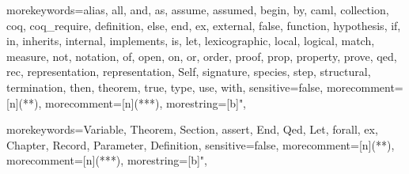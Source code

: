 \newcommand{\ocaml}{{\sf OCaml}}
\newcommand{\moca}{{\sf Moca}}
\newcommand{\focal}{{\sf FoCaL}}
\newcommand{\coq}{{\sf Coq}}
\newcommand{\cime}{{\sf CiME}}
\newcommand{\latex}{{\sf LaTeX}}
\newcommand{\zenon}{{\sf Zenon}}
\newcommand{\ocamldoc}{{\sf ocamldoc}}
\newcommand{\focdoc}{\textsc{focdoc}}
\newcommand{\focalize}{{\sf FoCaLize}}
\newcommand{\focalizec}{{\sf focalizec}}
\newcommand{\focalizedep}{{\sf focalizedep}}
\newcommand{\decldeps}[1] {\lbag\ #1\rbag}
\newcommand{\defdeps}[1]
  {\lbag\hspace{-0.2cm}\lbag\ #1\rbag\hspace{-0.2cm}\rbag}

  {morekeywords={alias, all, and, as, assume, assumed, begin, by, caml,
      collection, coq, coq_require, definition, else, end,
      ex, external, false, function, hypothesis, if, in,
      inherits, internal, implements, is, let, lexicographic,
      local, logical, match, measure, not, notation, of, open,
      on, or, order, proof, prop, property, prove, qed, rec,
      representation, representation, Self, signature, species, step,
      structural, termination, then, theorem, true, type, use,
      with},
    sensitive=false,
    morecomment=[n]{(*}{*)},  %
    morecomment=[n]{(**}{*)},  %
    morestring=[b]",
  }

\newcommand{\setlangfocalize}{
\lstset{
  language=Focal, tabsize=2, frame=single, breaklines=true,
  basicstyle=\ttfamily, framexleftmargin=1mm, xleftmargin=1mm
}
}
\setlangfocalize


  {morekeywords={Variable, Theorem, Section, assert, End, Qed, Let,
      forall, ex, Chapter, Record, Parameter, Definition},
    sensitive=false,
    morecomment=[n]{(*}{*)},   %
    morecomment=[n]{(**}{*)},  %
    morestring=[b]",
  }

\newcommand{\setlangcoq}{
\lstset{
  language=Coq, tabsize=2, frame=single, breaklines=true,
  basicstyle=\ttfamily, framexleftmargin=1mm, xleftmargin=1mm
}
}
